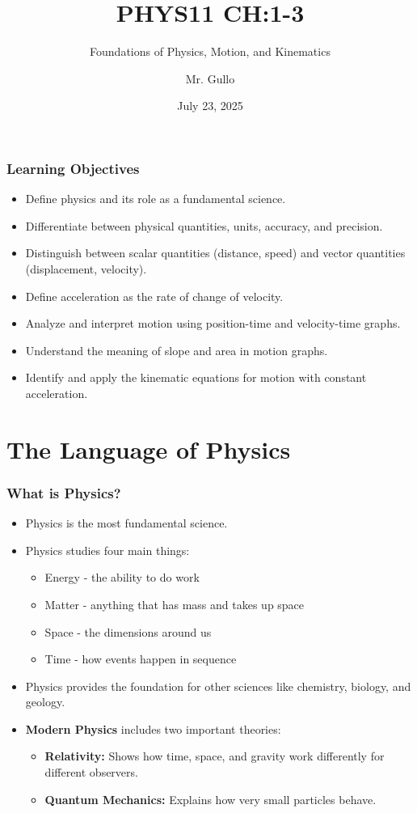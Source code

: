 \documentclass{beamer}
\title[Intro to Physics and Kinematics]{PHYS11 CH:1-3}
\subtitle{Foundations of Physics, Motion, and Kinematics}
\author[Mr. Gullo]{Mr. Gullo}
\date[Jul 2025]{July 23, 2025}
\begin{document}
\frame{\titlepage}

\begin{frame}
\frametitle{Learning Objectives}
\begin{itemize}
    \item Define physics and its role as a fundamental science.
    \pause
    \item Differentiate between physical quantities, units, accuracy, and precision.
    \pause
    \item Distinguish between scalar quantities (distance, speed) and vector quantities (displacement, velocity).
    \pause
    \item Define acceleration as the rate of change of velocity.
    \pause
    \item Analyze and interpret motion using position-time and velocity-time graphs.
    \pause
    \item Understand the meaning of slope and area in motion graphs.
    \pause
    \item Identify and apply the kinematic equations for motion with constant acceleration.
\end{itemize}
\end{frame}

\section{The Language of Physics}

\begin{frame}
\frametitle{What is Physics?}
\begin{itemize}
    \item Physics is the most fundamental science.
    \pause
    \item Physics studies four main things:
    \pause
    \begin{itemize}
        \item \alert{Energy} - the ability to do work
        \item \alert{Matter} - anything that has mass and takes up space
        \item \alert{Space} - the dimensions around us
        \item \alert{Time} - how events happen in sequence
    \end{itemize}
    \pause
    \item Physics provides the foundation for other sciences like chemistry, biology, and geology.
    \pause
    \item \textbf{Modern Physics} includes two important theories:
    \pause
    \begin{itemize}
        \item \textbf{Relativity:} Shows how time, space, and gravity work differently for different observers.
        \pause
        \item \textbf{Quantum Mechanics:} Explains how very small particles behave.
    \end{itemize}
\end{itemize}
\end{frame}
\end{document}
